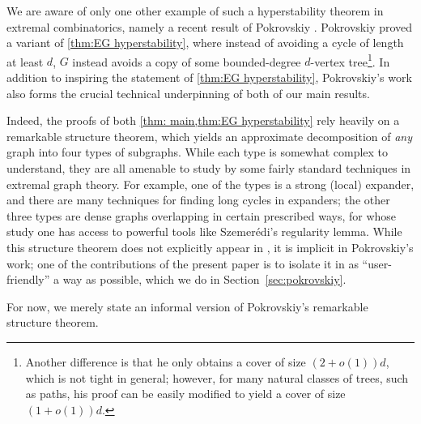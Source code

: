 \documentclass[10pt]{article}
\theoremstyle{definition}
\begin{document}
We are aware of only one other example of such a hyperstability theorem in extremal combinatorics, namely a recent result of Pokrovskiy \cite{alexey}. Pokrovskiy proved a variant of \cref{thm:EG hyperstability}, where instead of avoiding a cycle of length at least $d$, $G$ instead avoids a copy of some bounded-degree $d$-vertex tree\footnote{Another difference is that he only obtains a cover of size $(2+o(1))d$, which is not tight in general; however, for many natural classes of trees, such as paths, his proof can be easily modified to yield a cover of size $(1+o(1))d$.}. In addition to inspiring the statement of \cref{thm:EG hyperstability}, Pokrovskiy's work also forms the crucial technical underpinning of both of our main results.

Indeed, the proofs of both \cref{thm: main,thm:EG hyperstability} rely heavily on a remarkable structure theorem, which yields an approximate decomposition of \emph{any} graph into four types of subgraphs. While each type is somewhat complex to understand, they are all amenable to study by some fairly standard techniques in extremal graph theory. For example, one of the types is a strong (local) expander, and there are many techniques for finding long cycles in expanders; the other three types are dense graphs overlapping in certain prescribed ways, for whose study one has access to powerful tools like Szemer\'edi's regularity lemma. While this structure theorem does not explicitly appear in \cite{alexey}, it is implicit in Pokrovskiy's work; one of the contributions of the present paper is to isolate it in as ``user-friendly'' a way as possible, which we do in Section~\ref{sec:pokrovskiy}.


For now, we merely state an informal version of Pokrovskiy's remarkable structure theorem. 
\end{document}
